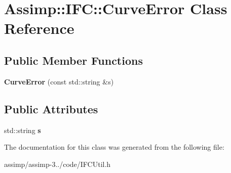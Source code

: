 \hypertarget{class_assimp_1_1_i_f_c_1_1_curve_error}{\section{Assimp\+:\+:I\+F\+C\+:\+:Curve\+Error Class Reference}
\label{class_assimp_1_1_i_f_c_1_1_curve_error}
}
\subsection*{Public Member Functions}
\begin{DoxyCompactItemize}
\item 
\hypertarget{class_assimp_1_1_i_f_c_1_1_curve_error_a7d533e55b163c8fee78391c9efdd351e}{{\bfseries Curve\+Error} (const std\+::string \&s)}\label{class_assimp_1_1_i_f_c_1_1_curve_error_a7d533e55b163c8fee78391c9efdd351e}

\end{DoxyCompactItemize}
\subsection*{Public Attributes}
\begin{DoxyCompactItemize}
\item 
\hypertarget{class_assimp_1_1_i_f_c_1_1_curve_error_aa635d93e3c40beb480e0a821816b9bac}{std\+::string {\bfseries s}}\label{class_assimp_1_1_i_f_c_1_1_curve_error_aa635d93e3c40beb480e0a821816b9bac}

\end{DoxyCompactItemize}


The documentation for this class was generated from the following file\+:\begin{DoxyCompactItemize}
\item 
assimp/assimp-\/3../code/I\+F\+C\+Util.\+h\end{DoxyCompactItemize}
